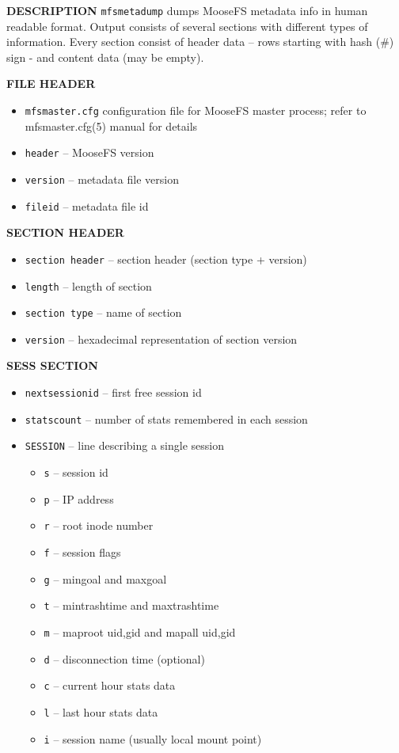 \documentclass[a4paper,11pt,english]{report}
\def\code#1{\texttt{#1}}
\begin{document}
				\textbf{DESCRIPTION}				
				\code{mfsmetadump} dumps MooseFS metadata info in human readable format.  Output consists of several sections with different types of information. Every section consist of header data -- rows starting with hash (\#) sign - and content data (may be empty).
				\newpage
				
				\textbf{FILE HEADER}
				\begin{itemize}
					\item \code{mfsmaster.cfg}
						configuration file for MooseFS master process; refer to
						mfsmaster.cfg(5) manual for details
					\item \code{header}              -- MooseFS version
					\item \code{version}             -- metadata file version
					\item \code{fileid}              -- metadata file id
				\end{itemize}
				\bigskip
				
				\textbf{SECTION HEADER}
				\begin{itemize}
					\item \code{section header}      -- section header (section type + version)
					\item \code{length}              -- length of section
					\item \code{section type}        -- name of section
					\item \code{version}             -- hexadecimal representation of section version
				\end{itemize}
				\bigskip
				
				\textbf{SESS SECTION}
				\begin{itemize}
					\item \code{nextsessionid}       -- first free session id
					\item \code{statscount}          -- number of stats remembered in each session
					\item \code{SESSION}   -- line describing a single session
					\begin{itemize}
						\item \code{s}      -- session id
						\item \code{p}      -- IP address
						\item \code{r}      -- root inode number
						\item \code{f}      -- session flags
						\item \code{g}      -- mingoal and maxgoal
						\item \code{t}      -- mintrashtime and maxtrashtime
						\item \code{m}      -- maproot uid,gid and mapall uid,gid
						\item \code{d}      -- disconnection time (optional)
						\item \code{c}      -- current hour stats data
						\item \code{l}      -- last hour stats data
						\item \code{i}      -- session name (usually local mount point)
					\end{itemize}
				\end{itemize}
				\bigskip
				
\end{document}
